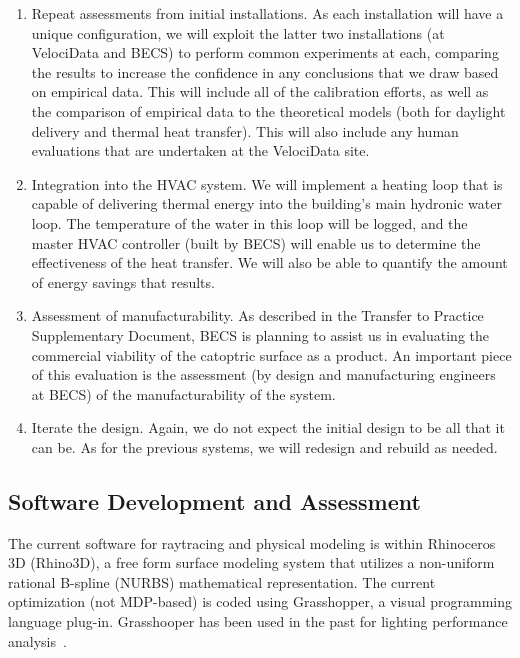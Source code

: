 \begin{enumerate}

\item Repeat assessments from initial installations.
As each installation will have a unique configuration, we will exploit the
latter two installations (at VelociData and BECS) to perform common
experiments at each, comparing the results to increase the confidence
in any conclusions that we draw based on empirical data.
This will include all of the calibration efforts, as well as the comparison
of empirical data to the theoretical models (both for daylight delivery
and thermal heat transfer).
This will also include any human evaluations that are undertaken at
the VelociData site.

\item Integration into the HVAC system.
We will implement a heating loop that is capable of delivering
thermal energy into the building's main hydronic water loop.
The temperature of the water in this loop will be logged, and the
master HVAC controller (built by BECS) will enable us to determine
the effectiveness of the heat transfer.  We will also be able to
quantify the amount of energy savings that results.

\item Assessment of manufacturability.
As described in the Transfer to Practice Supplementary Document, BECS
is planning to assist us in evaluating the commercial viability of the
catoptric surface as a product.  An important piece of this evaluation is
the assessment (by design and manufacturing engineers at BECS) of the
manufacturability of the system.

\item Iterate the design. Again, we do not expect the initial design
to be all that it can be. As for the previous systems, we will redesign
and rebuild as needed.

\end{enumerate}

\subsection{Software Development and Assessment}

The current software for raytracing and physical modeling is within
Rhinoceros 3D (Rhino3D), a free form surface modeling system that utilizes a
non-uniform rational B-spline (NURBS) mathematical representation.
The current optimization (not MDP-based) is coded using
Grasshopper, a visual programming language plug-in.
Grasshooper has been used in the past for lighting performance
analysis~\cite{Echarri16,Willis16}.

